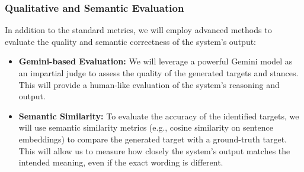 \documentclass{article}
\begin{document}
\subsubsection{Qualitative and Semantic Evaluation}
In addition to the standard metrics, we will employ advanced methods to evaluate the quality and semantic correctness of the system's output:
\begin{itemize}
    \item \textbf{Gemini-based Evaluation:} We will leverage a powerful Gemini model as an impartial judge to assess the quality of the generated targets and stances. This will provide a human-like evaluation of the system's reasoning and output.
    \item \textbf{Semantic Similarity:} To evaluate the accuracy of the identified targets, we will use semantic similarity metrics (e.g., cosine similarity on sentence embeddings) to compare the generated target with a ground-truth target. This will allow us to measure how closely the system's output matches the intended meaning, even if the exact wording is different.
\end{itemize}
\end{document}
